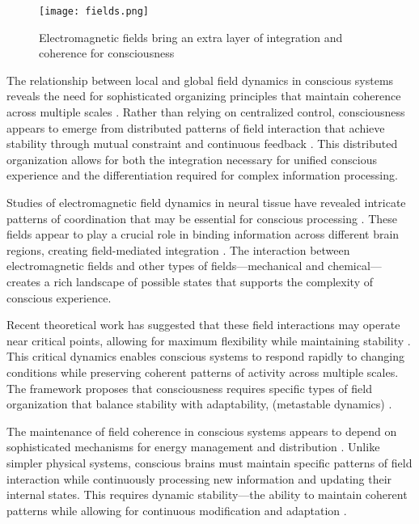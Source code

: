 \begin{refsection}
\begin{figure}[h]
    \centering
    \texttt{[image: fields.png]}

    \caption{Electromagnetic fields bring an extra layer of integration and coherence for consciousness}
\end{figure}

The relationship between local and global field dynamics in conscious systems reveals the need for sophisticated organizing principles that maintain coherence across multiple scales \cite{Freeman2006}. Rather than relying on centralized control, consciousness appears to emerge from distributed patterns of field interaction that achieve stability through mutual constraint and continuous feedback \cite{Nunez2010}. This distributed organization allows for both the integration necessary for unified conscious experience and the differentiation required for complex information processing.

Studies of electromagnetic field dynamics in neural tissue have revealed intricate patterns of coordination that may be essential for conscious processing \cite{McFadden2002}. These fields appear to play a crucial role in binding information across different brain regions, creating field-mediated integration \cite{Pockett2012}. The interaction between electromagnetic fields and other types of fields—mechanical and chemical—creates a rich landscape of possible states that supports the complexity of conscious experience.

Recent theoretical work has suggested that these field interactions may operate near critical points, allowing for maximum flexibility while maintaining stability \cite{Haken2006}. This critical dynamics enables conscious systems to respond rapidly to changing conditions while preserving coherent patterns of activity across multiple scales. The framework proposes that consciousness requires specific types of field organization that balance stability with adaptability, (metastable dynamics) \cite{Kelso2012}.

The maintenance of field coherence in conscious systems appears to depend on sophisticated mechanisms for energy management and distribution \cite{Raichle2006}. Unlike simpler physical systems, conscious brains must maintain specific patterns of field interaction while continuously processing new information and updating their internal states. This requires dynamic stability—the ability to maintain coherent patterns while allowing for continuous modification and adaptation \cite{Singer2009}.


\end{refsection}
